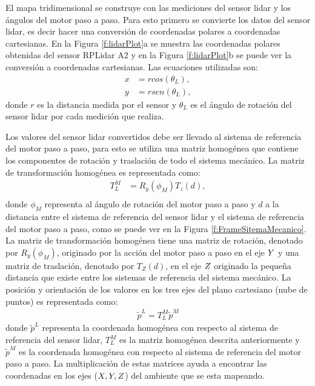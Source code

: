 El mapa tridimensional se construye con las mediciones del sensor lidar y los ángulos del motor paso
a paso. Para esto primero se convierte los datos del sensor lidar, es decir hacer una conversión 
de coordenadas polares a coordenadas cartesianas. En la Figura \ref{f:lidarPlot}a se muestra las 
coordenadas polares obtenidas del sensor RPLidar A2 y en la Figura \ref{f:lidarPlot}b se puede ver la 
conversión a coordenadas cartesianas. Las ecuaciones utilizadas son:
\begin{align*}
	x &= rcos(\theta_{L}), \\
	y &= rsen(\theta_{L}),
\end{align*}
donde $r$ es la distancia medida por el sensor y $\theta_{L}$ es el ángulo de rotación del sensor 
lidar por cada medición que realiza.

Los valores del sensor lidar convertidos debe ser llevado al sistema de referencia del motor paso a 
paso, para esto se utiliza una matriz homogénea que contiene los componentes de rotación y traslación
de todo el sistema mecánico. La matriz de transformación homogénea es representada como:
\begin{align*}
	T_{L}^{M} &= R_{y}(\phi_{M}) T_{z}(d), \\
\end{align*}
donde $\phi_{M}$ representa al ángulo de rotación del motor paso a paso y $d$ a la distancia entre el 
sistema de referencia del sensor lidar y el sistema de referencia del motor paso a paso, como se 
puede ver en la Figura \ref{f:FrameSitemaMecanico}. La matriz  de transformación homogénea
tiene una matriz de rotación, denotado por $R_{y}(\phi_{M})$, originado por la acción del 
motor paso a paso en el eje $\mathnormal Y$ y una matriz de traslación, denotado por $T_{Z}(d)$, en el 
eje $\mathnormal Z$ originado la pequeña distancia que existe entre los sistemas de referencia 
del sistema mecánico. La posición y orientación de los valores en los tres ejes del plano
cartesiano (nube de puntos) es representada como:
\begin{align}
	\tilde{p}^{L} = T_{L}^{M} \tilde{p}^{M}
	\label{eqn:MatrizHomogenea}
\end{align}
donde $\tilde{p}^{L}$ representa la coordenada homogénea con respecto al sistema de referencia del sensor
lidar, $T_{L}^{M}$ es la matriz homogénea descrita anteriormente y $\tilde{p}^{M}$ es la coordenada 
homogénea con respecto al sistema de referencia del motor paso a paso. La multiplicación de estas matrices
ayuda a encontrar las coordenadas en los ejes ($\mathnormal X,\mathnormal Y,\mathnormal Z$) del ambiente
que se esta mapeando.

